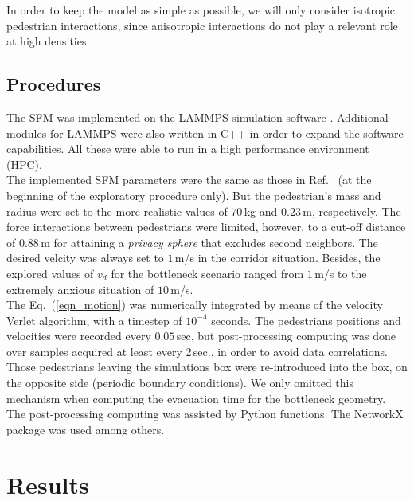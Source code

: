 \documentclass[preprint,12pt]{elsarticle}
\begin{document}
In order to keep the model as simple as possible, we will only consider 
isotropic pedestrian interactions, since anisotropic
interactions do not play a relevant role at high densities. \\ 



\subsection{Procedures} 

The SFM was implemented on the LAMMPS simulation software \cite{plimpton}. 
Additional modules for LAMMPS were also written in C++ in order to expand the 
software capabilities. All these were able to run in a high performance 
environment (HPC). \\


The implemented SFM parameters were the same as those in 
Ref.~\cite{helbing_2000} (at the beginning of the exploratory procedure only). 
But the pedestrian's mass and radius were set to the more realistic values of 
$70\,$kg and $0.23\,$m, respectively. The force interactions between 
pedestrians were limited, however, to a cut-off distance of $0.88\,$m for 
attaining a \textit{privacy sphere} that excludes second neighbors. The desired 
velcity was always set to $1\,$m/s in the corridor situation. Besides, the 
explored values of $v_d$ for the bottleneck scenario ranged from $1\,$m/s to the 
extremely anxious situation of $10\,$m/s. \\


The Eq.~(\ref{eqn_motion}) was numerically integrated by means of the velocity 
Verlet algorithm, with a timestep of $10^{-4}$ seconds. The pedestrians 
positions and velocities were recorded every $0.05\,$sec, but post-processing 
computing was done over samples acquired at least every $2\,$sec., in order to avoid 
data correlations. Those pedestrians leaving the simulations box were 
re-introduced into the box, on the opposite side (periodic boundary 
conditions). We only omitted this mechanism when computing the evacuation time 
for the bottleneck geometry. \\ 


The post-processing computing was assisted by Python functions. The NetworkX 
package was used among others.   \\



\section{\label{results}Results}
\end{document}
